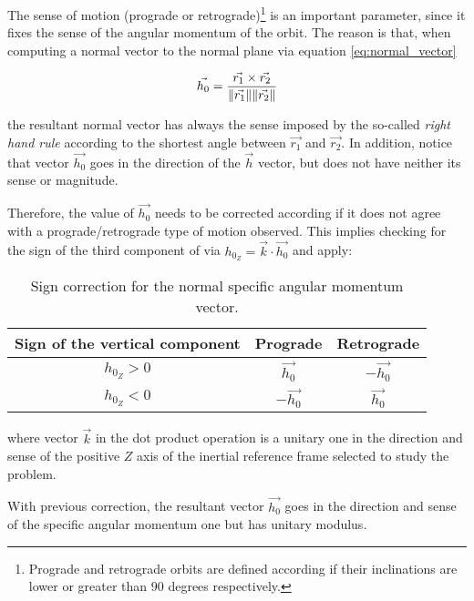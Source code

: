 The sense of motion (prograde or retrograde)\footnote{Prograde and retrograde
  orbits are defined according if their inclinations are lower or greater than
  $90$ degrees respectively.} is an important parameter, since it fixes the sense
of the angular momentum of the orbit. The reason is that, when computing a
normal vector to the normal plane via equation \ref{eq:normal_vector}

\begin{equation}
  \vec{h_{0}} = \frac{\vec{r_{1}} \times \vec{r_{2}}}{\lVert\vec{r_{1}}\rVert\lVert\vec{r_{2}}\rVert}
  \label{eq:normal_vector}
\end{equation}

the resultant normal vector has always the sense imposed by the so-called
\textit{right hand rule} according to the shortest angle between $\vec{r_{1}}$
and $\vec{r_{2}}$. In addition, notice that vector $\vec{h_{0}}$ goes in the
direction of the $\vec{h}$ vector, but does not have neither its sense or
magnitude.

Therefore, the value of $\vec{h_{0}}$ needs to be corrected according if it does
not agree with a prograde/retrograde type of motion observed. This implies
checking for the sign of the third component of via $h_{0_{Z}} =
  \vec{k} \cdot \vec{h_{0}}$ and apply:

\vspace{0.15cm}
\bgroup
\def\arraystretch{1.5}
\begin{table}[H]
  \centering
  \begin{tabular}{|c|c|c|}
    \hline
    \textbf{Sign of the vertical component} & \textbf{Prograde} & \textbf{Retrograde} \\ \hline
    $h_{0_{Z}} > 0$                         & $\vec{h_{0}}$     & $-\vec{h_{0}}$      \\ \hline
    $h_{0_{Z}} < 0$                         & $-\vec{h_{0}}$    & $\vec{h_{0}}$       \\ \hline
  \end{tabular}
  \caption{Sign correction for the normal specific angular momentum vector.}
\end{table}
\egroup

where vector $\vec{k}$ in the dot product operation is a unitary one in the
direction and sense of the positive $Z$ axis of the inertial reference frame
selected to study the problem.

With previous correction, the resultant vector $\vec{h_{0}}$ goes in the
direction and sense of the specific angular momentum one but has unitary
modulus.

